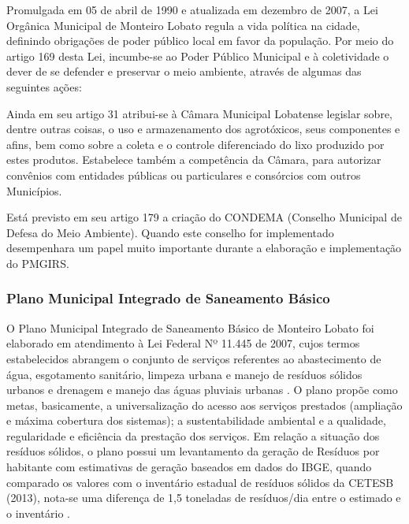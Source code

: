 	Promulgada em 05 de abril de 1990 e atualizada em dezembro de 2007, a Lei Orgânica Municipal de Monteiro Lobato regula a vida política na cidade, definindo obrigações de poder público local em favor da população. Por meio do artigo 169 desta Lei, incumbe-se ao Poder Público Municipal e à coletividade o dever de se defender e preservar o meio ambiente, através de algumas das seguintes ações:
	
	
	Ainda em seu artigo 31 atribui-se à Câmara Municipal Lobatense legislar sobre, dentre outras coisas, o uso e armazenamento dos agrotóxicos, seus componentes e afins, bem como sobre a coleta e o controle diferenciado do lixo produzido por estes produtos. Estabelece também a competência da Câmara, para autorizar convênios com entidades públicas ou particulares e consórcios com outros Municípios.
	
	Está previsto em seu artigo 179 a criação do CONDEMA (Conselho Municipal de Defesa do Meio Ambiente). Quando este conselho for implementado desempenhara um papel muito importante durante a elaboração e implementação do PMGIRS.
	
	\subsubsection{Plano Municipal Integrado de Saneamento Básico}
	
	O Plano Municipal Integrado de Saneamento Básico de Monteiro Lobato foi elaborado em atendimento à Lei Federal Nº 11.445 de 2007, cujos termos estabelecidos abrangem o conjunto de serviços referentes ao abastecimento de água, esgotamento sanitário, limpeza urbana e manejo de resíduos sólidos urbanos e drenagem e manejo das águas pluviais urbanas \cite{MonteiroLobato}. O plano propõe como metas, basicamente, a universalização do acesso aos serviços prestados (ampliação e máxima cobertura dos sistemas); a sustentabilidade ambiental e a qualidade, regularidade e eficiência da prestação dos serviços. Em relação a situação dos resíduos sólidos, o plano possui um levantamento da geração de Resíduos por habitante com estimativas de geração baseados em dados do IBGE, quando comparado os valores com o inventário estadual de resíduos sólidos da CETESB (2013), nota-se uma diferença de 1,5 toneladas de resíduos/dia entre o estimado e o inventário \cite{CETESB2013}.
	
